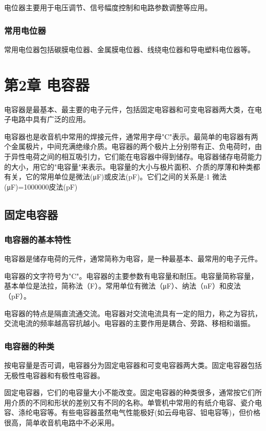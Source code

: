 \documentclass[12pt,UTF8]{ctexbook}
\begin{document}
电位器主要用于电压调节、信号幅度控制和电路参数调整等应用。

\subsection{常用电位器}

常用电位器包括碳膜电位器、金属膜电位器、线绕电位器和导电塑料电位器等。

\chapter{第2章 电容器}

电容器是最基本、最主要的电子元件，包括固定电容器和可变电容器两大类，在电子电路中具有广泛的应用。

电容器也是收音机中常用的焊接元件，通常用字母"C"表示。最简单的电容器有两个金属极片，中间充满绝缘介质。电容器的两个极片上分别带有正、负电荷时，由于异性电荷之间的相互吸引力，它们能在电容器中得到储存。电容器储存电荷能力的大小，用它的"电容量"来表示。电容量的大小与极片面积、介质的厚薄和种类都有关，它的常用单位是微法(μF)或皮法(pF)。它们之间的关系是:1 微法(μF)=1000000皮法(pF)

\section{固定电容器}

\subsection{电容器的基本特性}

电容器是储存电荷的元件，通常简称为电容，是一种最基本、最常用的电子元件。

电容器的文字符号为"C"。电容器的主要参数有电容量和耐压。电容量简称容量，基本单位是法拉，简称法（F）。常用单位有微法（μF）、纳法（nF）和皮法（pF）。

电容器的特点是隔直流通交流。电容器对交流电流具有一定的阻力，称之为容抗，交流电流的频率越高容抗越小。电容器的主要作用是耦合、旁路、移相和谐振。

\subsection{电容器的种类}

按电容量是否可调，电容器分为固定电容器和可变电容器两大类。固定电容器包括无极性电容器和有极性电容器。

固定电容器，它们的电容量大小不能改变。固定电容器的种类很多，通常按它们所用介质的不同和形状的差别又有不同的名称。单管机中常用的有纸介电容、瓷介电容、涤纶电容等。有些电容器虽然电气性能极好(如云母电容、钽电容等)，但价格很高，简单收音机电路中不必采用。
\end{document}
